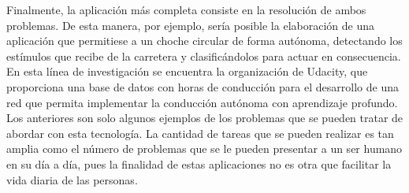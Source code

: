 Finalmente, la aplicación más completa consiste en la resolución de ambos problemas. De esta manera, por ejemplo, sería posible la elaboración de una aplicación que permitiese a un choche circular de forma autónoma, detectando los estímulos que recibe de la carretera y clasificándolos para actuar en consecuencia. En esta línea de investigación se encuentra la organización de Udacity, que proporciona una base de datos con horas de conducción para el desarrollo de una red que permita implementar la conducción autónoma con aprendizaje profundo.\\

Los anteriores son solo algunos ejemplos de los problemas que se pueden tratar de abordar con esta tecnología. La cantidad de tareas que se pueden realizar es tan amplia como el número de problemas que se le pueden presentar a un ser humano en su día a día, pues la finalidad de estas aplicaciones no es otra que facilitar la vida diaria de las personas.